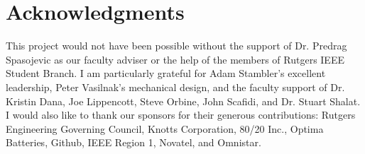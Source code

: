 \documentclass[twocolumn,11pt]{article}
\begin{document}
\section{Acknowledgments}
This project would not have been possible without the support of Dr. Predrag
Spasojevic as our faculty adviser or the help of the members of Rutgers IEEE
Student Branch. I am particularly grateful for Adam Stambler's excellent
leadership, Peter Vasilnak's mechanical design, and the faculty support of Dr.
Kristin Dana, Joe Lippencott, Steve Orbine, John Scafidi, and Dr. Stuart
Shalat. I would also like to thank our sponsors for their generous
contributions: Rutgers Engineering Governing Council, Knotts Corporation, 80/20
Inc., Optima Batteries, Github, IEEE Region 1, Novatel, and Omnistar.

{\footnotesize
{}

}
\end{document}
